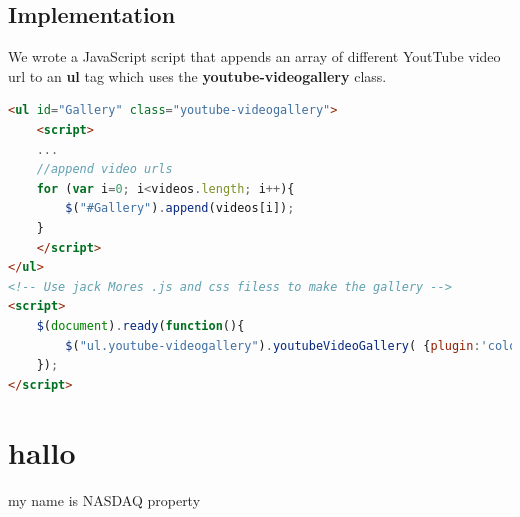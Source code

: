 \newpage
\subsection{Implementation}
We wrote a JavaScript script that appends an array of different YoutTube video url to an \textbf{ul} tag which uses the \textbf{youtube-videogallery} class.   

\begin{lstlisting}[language=html, caption= 
extracts from the video gallery src]
<ul id="Gallery" class="youtube-videogallery">
	<script>
	... 
	//append video urls
	for (var i=0; i<videos.length; i++){
		$("#Gallery").append(videos[i]);
	}
	</script>
</ul>
<!-- Use jack Mores .js and css filess to make the gallery -->
<script>
    $(document).ready(function(){
        $("ul.youtube-videogallery").youtubeVideoGallery( {plugin:'colorbox',assetFolder:'../'} );
    });
</script> 
\end{lstlisting}




\section{hallo}
my name is NASDAQ property  